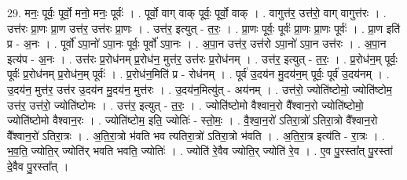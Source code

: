 \documentclass[17pt]{extarticle}
\begin{document}
29. मनः॒ पूर्वः॒ पूर्वो॒ मनो॒ मनः॒ पूर्वः॑ । . पूर्वो॒ वाग् वाक् पूर्वः॒ पूर्वो॒ वाक् । . वागुत्त॑र॒ उत्त॑रो॒ वाग् वागुत्त॑रः । . उत्त॑रः प्रा॒णः प्रा॒ण उत्त॑र॒ उत्त॑रः प्रा॒णः । . उत्त॑र॒ इत्युत् - त॒रः॒ । . प्रा॒णः पूर्वः॒ पूर्वः॑ प्रा॒णः प्रा॒णः पूर्वः॑ । . प्रा॒ण इति॑ प्र - अ॒नः । . पूर्वो॑ ऽपा॒नो॑ ऽपा॒नः पूर्वः॒ पूर्वो॑ ऽपा॒नः । . अ॒पा॒न उत्त॑र॒ उत्त॑रो ऽपा॒नो॑ ऽपा॒न उत्त॑रः । . अ॒पा॒न इत्य॑प - अ॒नः । . उत्त॑रः प्र॒रोध॑नम् प्र॒रोध॑न॒ मुत्त॑र॒ उत्त॑रः प्र॒रोध॑नम् । . उत्त॑र॒ इत्युत् - त॒रः॒ । . प्र॒रोध॑न॒म् पूर्वः॒ पूर्वः॑ प्र॒रोध॑नम् प्र॒रोध॑न॒म् पूर्वः॑ । . प्र॒रोध॑न॒मिति॑ प्र - रोध॑नम् । . पूर्व॑ उ॒दय॑न मु॒दय॑न॒म् पूर्वः॒ पूर्व॑ उ॒दय॑नम् । . उ॒दय॑न॒ मुत्त॑र॒ उत्त॑र उ॒दय॑न मु॒दय॑न॒ मुत्त॑रः । . उ॒दय॑न॒मित्यु॑त् - अय॑नम् । . उत्त॑रो॒ ज्योति॑ष्टोमो॒ ज्योति॑ष्टोम॒ उत्त॑र॒ उत्त॑रो॒ ज्योति॑ष्टोमः । . उत्त॑र॒ इत्युत् - त॒रः॒ । . ज्योति॑ष्टोमो वैश्वान॒रो वै᳚श्वान॒रो ज्योति॑ष्टोमो॒ ज्योति॑ष्टोमो वैश्वान॒रः । . ज्योति॑ष्टोम॒ इति॒ ज्योतिः॑ - स्तो॒मः॒ । . वै॒श्वा॒न॒रो॑ ऽतिरा॒त्रो॑ ऽतिरा॒त्रो वै᳚श्वान॒रो वै᳚श्वान॒रो॑ ऽतिरा॒त्रः । . अ॒ति॒रा॒त्रो भ॑वति भव त्यतिरा॒त्रो॑ ऽतिरा॒त्रो भ॑वति । . अ॒ति॒रा॒त्र इत्य॑ति - रा॒त्रः । . भ॒व॒ति॒ ज्योति॒र् ज्योति॑र् भवति भवति॒ ज्योतिः॑ । . ज्योति॑ रे॒वैव ज्योति॒र् ज्योति॑ रे॒व । . ए॒व पु॒रस्ता᳚त् पु॒रस्ता॑ दे॒वैव पु॒रस्ता᳚त् । \newline
\end{document}
